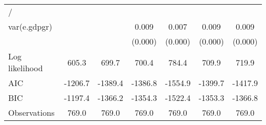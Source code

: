 \begin{table}[htbp]
\begin{tabular}{l*{6}{c}}
\hline
/                   &                     &                     &                     &                     &                     &                     \\
var(e.gdpgr)        &                     &                     &       0.009\sym{***}&       0.007\sym{***}&       0.009\sym{***}&       0.009\sym{***}\\
                    &                     &                     &     (0.000)         &     (0.000)         &     (0.000)         &     (0.000)         \\
\hline
Log likelihood      &       605.3         &       699.7         &       700.4         &       784.4         &       709.9         &       719.9         \\
AIC                 &     -1206.7         &     -1389.4         &     -1386.8         &     -1554.9         &     -1399.7         &     -1417.9         \\
BIC                 &     -1197.4         &     -1366.2         &     -1354.3         &     -1522.4         &     -1353.3         &     -1366.8         \\
Observations        &       769.0         &       769.0         &       769.0         &       769.0         &       769.0         &       769.0         \\
\hline\hline
\end{tabular}
\end{table}
